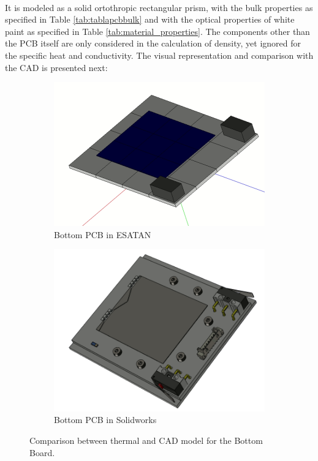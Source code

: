 \paragraph{}

It is modeled as a solid ortothropic rectangular prism, with the bulk properties as specified in Table \ref{tab:tablapcbbulk}
and with the optical properties of white paint as specified in Table \ref{tab:material_properties}. The components other than
the PCB itself are only considered in the calculation of density, yet ignored for the specific heat and conductivity.
The visual representation and comparison with the CAD is presented next: 

\begin{figure}[H]
    \centering
    \begin{subfigure}{.5\textwidth}
      \centering
      \includegraphics[width=.6\linewidth]{res/img/5_simulationanalisys/Comparisons/ESATAN/BottomPCB.PNG}
      \caption{Bottom PCB in ESATAN}
      \label{fig:bottompcb}
    \end{subfigure}%
    \begin{subfigure}{.5\textwidth}
      \centering
      \includegraphics[width=.5\linewidth]{res/img/5_simulationanalisys/Comparisons/SLDW/BottomPCB_Solid.PNG}
      \caption{Bottom PCB in Solidworks}
      \label{fig:bottompcbsolid}
    \end{subfigure}
    \caption{Comparison between thermal and CAD model for the Bottom Board.}
    \label{fig:bottompcbim}
\end{figure}

